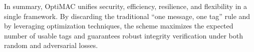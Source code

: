 In summary, OptiMAC unifies security, efficiency, resilience, and flexibility
in a single framework. By discarding the traditional “one message, one tag”
rule and by leveraging optimization techniques, the scheme maximizes the
expected number of usable tags and guarantees robust integrity verification
under both random and adversarial losses.